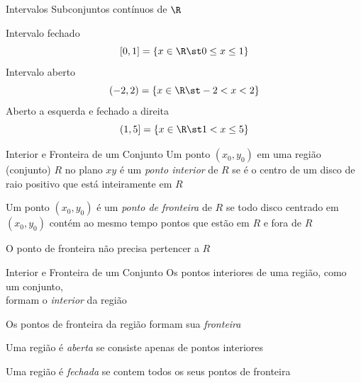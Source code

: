%
%
%

\begin{frame}{Intervalos}
  Subconjuntos contínuos de $\R$
  \vspace{\baselineskip}

  \pause
  Intervalo fechado
  \[
    [0, 1] = \left\{ x\in\R\st 0 \leq x \leq 1 \right\}
  \]
  \pause
  Intervalo aberto
  \[
    (-2, 2) = \left\{ x\in\R\st -2 < x < 2 \right\}
  \]
  \pause
  Aberto a esquerda e fechado a direita
  \[
    (1, 5] = \left\{ x\in\R\st 1 < x \leq 5 \right\}
  \]
\end{frame}

\begin{frame}{Interior e Fronteira de um Conjunto}
  Um ponto $(x_0, y_0)$ em uma região (conjunto) $R$ no plano $xy$ é um
  \emph{ponto interior} de $R$ se é o centro de um disco de raio positivo que está
  inteiramente em $R$

  \pause
  \vspace{\baselineskip}
  Um ponto $(x_0, y_0)$ é um \emph{ponto de fronteira} de $R$ se todo disco
  centrado em $(x_0, y_0)$ contém ao mesmo tempo pontos que estão em $R$ e fora de $R$

  \pause
  \vspace{\baselineskip}
  O ponto de fronteira não precisa pertencer a $R$
\end{frame}

\begin{frame}{Interior e Fronteira de um Conjunto}
  Os pontos interiores de uma região, como um conjunto, \\
  formam o \emph{interior} da região

  \pause
  \vspace{\baselineskip}
  Os pontos de fronteira da região formam sua \emph{fronteira}

  \pause
  \vspace{\baselineskip}
  Uma região é \emph{aberta} se consiste apenas de pontos interiores

  \pause
  \vspace{\baselineskip}
  Uma região é \emph{fechada} se contem todos os seus pontos de fronteira
\end{frame}

